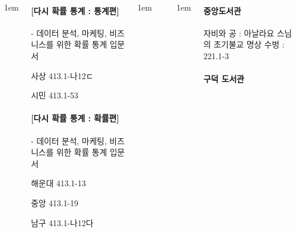 \documentclass[	17pt, 
							a1paper, 
							portrait, %
							margin=0mm, %
							innermargin=10mm,  		%
							blockverticalspace=4mm, %
							colspace=5mm, 
							subcolspace=0mm
							]{tikzposter}
\begin{document}
\begin{columns}
			{
					\setlength{\leftmargini}{4em}
					\setlength{\labelsep} {1em}
				\begin{LARGE}

\paragraph{[다시 확률 통계 : 통계편]}
 - 데이터 분석, 마케팅, 비즈니스를 위한 확률 통계 입문서

사상    413.1-나12ㄷ

시민   413.1-53


\paragraph{[다시 확률 통계 : 확률편]}
 - 데이터 분석, 마케팅, 비즈니스를 위한 확률 통계 입문서

해운대  413.1-13

중앙   413.1-19

남구  413.1-나12다  


				\end{LARGE}
			} %




			{
					\setlength{\leftmargini}{4em}
					\setlength{\labelsep} {1em}
				\begin{LARGE}



				\end{LARGE}
			} %

			{
					\setlength{\leftmargini}{4em}
					\setlength{\labelsep} {1em}
				\begin{LARGE}

		\paragraph{중앙도서관}

		자비와 공 : 아날라요 스님의 초기불교 명상 수벙 : 221.1-3

		\paragraph{		구덕 도서관}


\end{LARGE}}
\end{columns}
\end{document}
